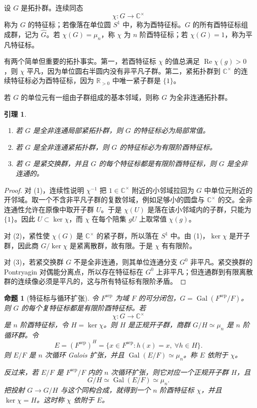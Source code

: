 \documentclass[11pt,a4paper,openany]{ctexbook}
\numberwithin{equation}{chapter}
\newcommand{\R}{\mathbb{R}}
\newcommand{\C}{\mathbb{C}}
\newcommand{\Gal}{\operatorname{Gal}}
\theoremstyle{plain}
\newtheorem{proposition}[theorem]{命题}
\newtheorem{lemma}[theorem]{引理}
\theoremstyle{definition}
\theoremstyle{remark}
\begin{document}
设 $G$ 是拓扑群。连续同态
\[
\chi:G\longrightarrow\C^\times
\]
称为 $G$ 的特征标；若像落在单位圆 $S^1$ 中，称为酉特征标。$G$ 的所有酉特征标组成群，记为 $\widehat G$。若 $\chi(G)=\mu_n$，称 $\chi$ 为 $n$ 阶酉特征标；若 $\chi(G)=1$，称为平凡特征标。

有两个简单但重要的拓扑事实。第一，若酉特征标 $\chi$ 的值总满足 $\operatorname{Re}\chi(g)>0$，则 $\chi$ 平凡，因为单位圆右半圆内没有非平凡子群。第二，紧拓扑群到 $\C^\times$ 的连续特征标必为酉特征标，因为 $\R_{>0}$ 中唯一紧子群是 $\{1\}$。

若 $G$ 的单位元有一组由子群组成的基本邻域，则称 $G$ 为全非连通拓扑群。

\begin{lemma}
\begin{enumerate}[label=(\arabic*)]
\item 若 $G$ 是全非连通局部紧拓扑群，则 $G$ 的特征标必为局部常值。
\item 若 $G$ 是全非连通紧拓扑群，则 $G$ 的特征标必为有限阶酉特征标。
\item 若 $G$ 是紧交换群，并且 $G$ 的每个特征标都是有限阶酉特征标，则 $G$ 是全非连通的。
\end{enumerate}
\end{lemma}

\begin{proof}
对 (1)，连续性说明 $\chi^{-1}$ 把 $1\in\C^\times$ 附近的小邻域拉回为 $G$ 中单位元附近的开邻域。取一个不含非平凡子群的复数邻域，例如足够小的圆盘与 $\C^\times$ 的交。全非连通性允许在原像中取开子群 $U$。于是 $\chi(U)$ 是落在该小邻域内的子群，只能为 $\{1\}$。因此 $U\subset\ker\chi$，而 $\chi$ 在每个陪集 $gU$ 上取常值 $\chi(g)$。

对 (2)，紧性使 $\chi(G)$ 是 $\C^\times$ 的紧子群，所以落在 $S^1$ 中。由 (1)，$\ker\chi$ 是开子群，因此商 $G/\ker\chi$ 是紧离散群，故有限。于是 $\chi$ 有有限阶。

对 (3)，若紧交换群 $G$ 不是全非连通，则其单位连通分支 $G^0$ 非平凡。紧交换群的 Pontryagin 对偶能分离点，所以存在特征标在 $G^0$ 上非平凡；但连通群到有限离散群的连续像必须是平凡的，这与所有特征标有限阶矛盾。
\end{proof}

\begin{proposition}[特征标与循环扩张]
令 $F^{\mathrm{sep}}$ 为域 $F$ 的可分闭包，$G=\Gal(F^{\mathrm{sep}}/F)$。则 $G$ 的每个复特征标都是有限阶酉特征标。若
\[
\chi:G\to\C^\times
\]
是 $n$ 阶酉特征标，令 $H=\ker\chi$。则 $H$ 是正规开子群，商群 $G/H\simeq \mu_n$ 是 $n$ 阶循环群。令
\[
E=(F^{\mathrm{sep}})^H
=\{x\in F^{\mathrm{sep}}:h(x)=x,\ \forall h\in H\}.
\]
则 $E/F$ 是 $n$ 次循环 Galois 扩张，并且 $\Gal(E/F)\simeq\mu_n$。称 $E$ 依附于 $\chi$。

反过来，若 $E/F$ 是 $F^{\mathrm{sep}}/F$ 内的 $n$ 次循环扩张，则它对应一个正规开子群 $H$，且
\[
G/H\simeq \Gal(E/F)\simeq \mu_n.
\]
把投射 $G\to G/H$ 与这个同构合成，就得到一个 $n$ 阶酉特征标 $\chi$，并且 $\ker\chi=H$。这时称 $\chi$ 依附于 $E$。
\end{proposition}
\end{document}
